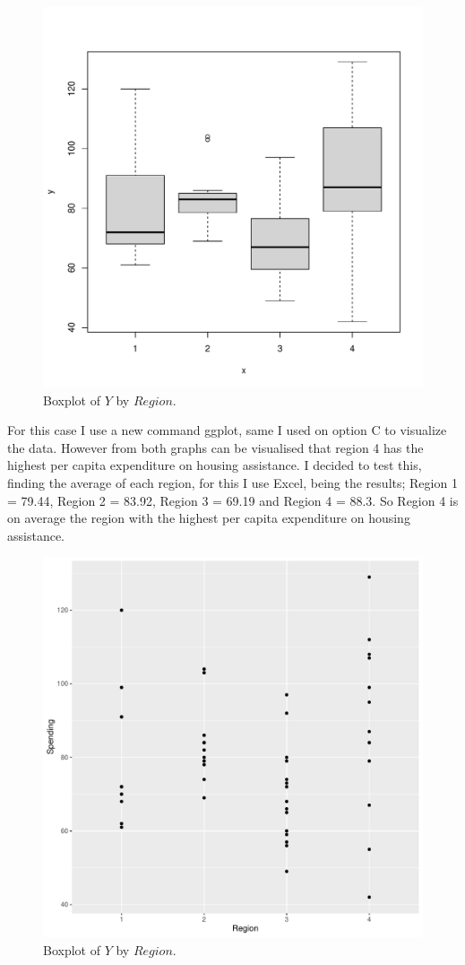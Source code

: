 \documentclass[12pt,letterpaper]{article}
\begin{document}
\begin{itemize}
	\begin{figure}[h!]\centering
		\caption{\footnotesize Boxplot of $Y$ by $Region$.}\vspace{-1cm}
		\label{fig:plot_3c}
		\includegraphics[width=.75\textwidth]{IMAGEP2_B1.pdf}
	\end{figure}
	
	For this case I use a new command ggplot, same I used on option C to visualize the data. However from both graphs can be visualised that region 4 has the highest per capita expenditure on housing assistance. 
	I decided to test this, finding the average of each region, for this I use Excel, being the results; Region 1 = 79.44, Region 2 = 83.92, Region 3 = 69.19 and Region 4 = 88.3.
	So Region 4 is on average the region with the highest per capita expenditure on housing assistance. 

\begin{figure}[h!]\centering
	\caption{\footnotesize Boxplot of $Y$ by $Region$.}\vspace{-1cm}
	\label{fig:plot_3c}
	\includegraphics[width=.75\textwidth]{IMAGEP2_B2.pdf}
\end{figure}





\end{itemize}
\end{document}
